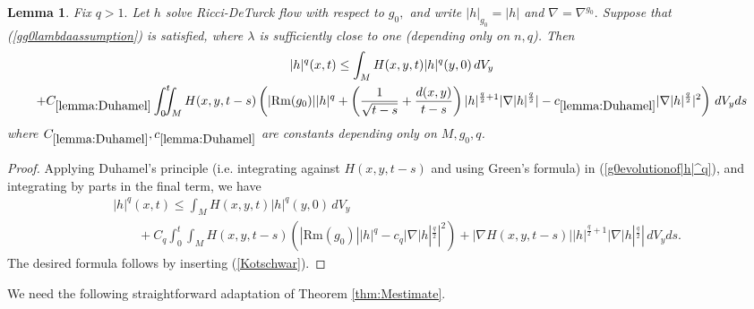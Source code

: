 \documentclass[12pt]{amsart}
\renewcommand{\1}{{\mathbf 1}}
\newcommand{\Rm}{\mathrm{Rm}}
\newtheorem{lemma}[thm]{Lemma}
\theoremstyle{others}
\numberwithin{equation}{section}
\begin{document}
\begin{lemma}\label{lemma:Duhamel} %
Fix $q > 1.$ Let $h$ solve Ricci-DeTurck flow with respect to $g_0,$ and write $|h|_{g_0} = |h|$ and $\nabla = \nabla^{g_0}.$ Suppose that (\ref{gg0lambdaassumption}) is satisfied, where $\lambda$ is sufficiently close to one (depending only on $n, q$).
Then
    \begin{multline*}%
        |h|^q(x,t)  \leq \int_M H(x,y,t) |h|^q(y,0) \, dV_y \\
         + C_{\ref{lemma:Duhamel}} \int_0^t \!\!\!\! \int_M H(x,y,t - s) \left( |\Rm(g_0)| |h|^q + \left( \frac1{\sqrt {t - s} } + \frac{d(x,y)}{t-s} \right) |h|^{\frac{q}{2} + 1} |\nabla |h|^{\frac{q}{2}} | - c_{\ref{lemma:Duhamel}} |\nabla |h|^{\frac{q}{2}} |^2 \right) \, dV_y ds
    \end{multline*}
    where %
    $C_{\ref{lemma:Duhamel}}, c_{\ref{lemma:Duhamel}}$ are constants depending only on $M, g_0, q$.
\end{lemma}
\begin{proof}
    Applying Duhamel's principle (i.e. integrating against $H(x,y,t-s)$ and using Green's formula) in (\ref{g0evolutionof|h|^q}), and integrating by parts in the final term, we have
            \begin{equation}\label{Duhamel}
        \begin{split}
        & |h|^q(x,t)  \leq \int_M H(x,y,t) |h|^q(y,0) \, dV_y \\
        & \qquad + C_q \int_0^t \!\!\!\! \int_M H(x,y,t - s) \left( |\Rm(g_0)| |h|^q - c_q |\nabla |h|^{\frac{q}{2}} |^2 \right) + \left| \nabla H(x,y,t - s) \right| |h|^{\frac{q}{2} + 1} |\nabla |h|^{\frac{q}{2}} | \, dV_y ds.
        \end{split}
    \end{equation}
    The desired formula follows by inserting (\ref{Kotschwar}).
\end{proof}





We need the following straightforward adaptation of Theorem \ref{thm:Mestimate}.
\end{document}

